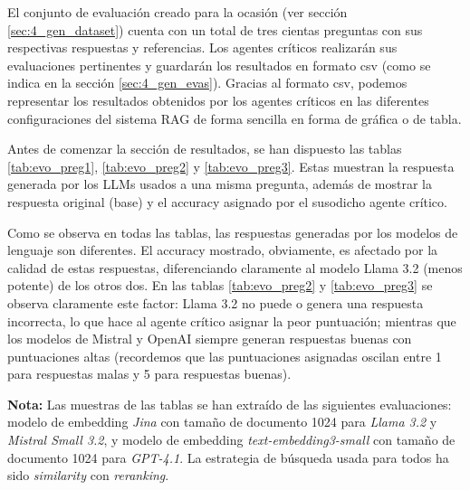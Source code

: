     	\noindent El conjunto de evaluación creado para la ocasión (ver sección \ref{sec:4_gen_dataset}) cuenta con un total de tres cientas preguntas con sus respectivas respuestas y referencias. Los agentes críticos realizarán sus evaluaciones pertinentes y guardarán los resultados en formato csv (como se indica en la sección \ref{sec:4_gen_evas}). Gracias al formato csv, podemos representar los resultados obtenidos por los agentes críticos en las diferentes configuraciones del sistema RAG de forma sencilla en forma de gráfica o de tabla.
    	
    	\noindent Antes de comenzar la sección de resultados, se han dispuesto las tablas \ref{tab:evo_preg1}, \ref{tab:evo_preg2} y \ref{tab:evo_preg3}. Estas muestran la respuesta generada por los LLMs usados a una misma pregunta, además de mostrar la respuesta original (base) y el accuracy asignado por el susodicho agente crítico. 
    	
    	\noindent Como se observa en todas las tablas, las respuestas generadas por los modelos de lenguaje son diferentes. El accuracy mostrado, obviamente, es afectado por la calidad de estas respuestas, diferenciando claramente al modelo Llama 3.2 (menos potente) de los otros dos. En las tablas \ref{tab:evo_preg2} y \ref{tab:evo_preg3} se observa claramente este factor: Llama 3.2 no puede o genera una respuesta incorrecta, lo que hace al agente crítico asignar la peor puntuación; mientras que los modelos de Mistral y OpenAI siempre generan respuestas buenas con puntuaciones altas (recordemos que las puntuaciones asignadas oscilan entre 1 para respuestas malas y 5 para respuestas buenas).
    	
    	\noindent \textbf{Nota:} Las muestras de las tablas se han extraído de las siguientes evaluaciones: modelo de embedding \textit{Jina} con tamaño de documento 1024 para \textit{Llama 3.2} y \textit{Mistral Small 3.2}, y modelo de embedding \textit{text-embedding3-small} con tamaño de documento 1024 para \textit{GPT-4.1}. La estrategia de búsqueda usada para todos ha sido \textit{similarity} con \textit{reranking}.
    	
